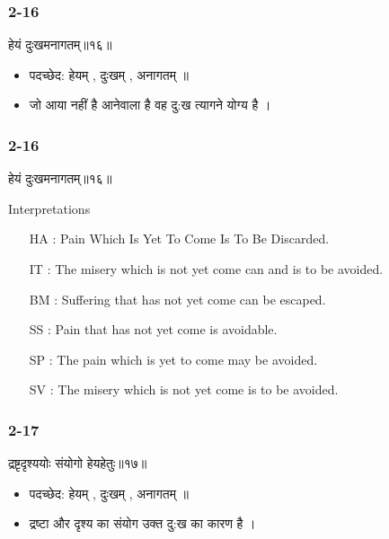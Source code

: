 \begin{frame}[fragile]\frametitle{2-16}
\begin{sanskrit}
हेयं दुःखमनागतम्॥१६॥
\end{sanskrit}

\begin{itemize}
\item पदच्छेद: हेयम् , दुःखम् , अनागतम् ॥
\item जो आया नहीं है आनेवाला है वह दु:ख त्यागने योग्य है ।
\end{itemize}
	
\end{frame}

\begin{frame}[fragile]\frametitle{2-16}
\begin{sanskrit}
हेयं दुःखमनागतम्॥१६॥
\end{sanskrit}

Interpretations
\begin{itemize}
\item [HA]: Pain Which Is Yet To Come Is To Be Discarded.
\item [IT]: The misery which is not yet come can and is to be avoided.
\item [BM]: Suffering that has not yet come can be escaped.
\item [SS]: Pain that has not yet come is avoidable.
\item [SP]: The pain which is yet to come may be avoided.
\item [SV]: The misery which is not yet come is to be avoided. 
\end{itemize}
	
\end{frame}

\begin{frame}[fragile]\frametitle{2-17}
\begin{sanskrit}
द्रष्टृदृश्ययोः संयोगो हेयहेतुः॥१७॥
\end{sanskrit}

\begin{itemize}
\item पदच्छेद: हेयम् , दुःखम् , अनागतम् ॥
\item द्रष्टा और दृश्य का संयोग उक्त दु:ख का कारण है ।
\end{itemize}
	
\end{frame}


